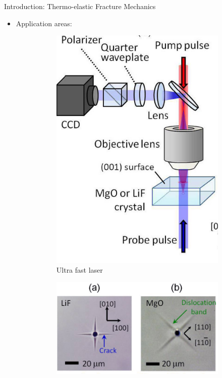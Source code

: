\documentclass{beamer}
\begin{document}
\begin{frame}[t,fragile]{Introduction: Thermo-elastic Fracture Mechanics}
\begin{itemize}
        \item Application areas:
       \vspace{-.1cm}
\begin{figure}[H]
      \begin{subfigure}{0.45\textwidth}
    \centering
   \includegraphics[scale=.1]{m}
 \vspace{-.2cm}
 \caption{\tiny Ultra fast laser}
 \end{subfigure}
\begin{subfigure}{0.45\textwidth}
    \centering
   \includegraphics[scale=.1]{l}

\end{subfigure}
\end{figure}
\end{itemize}
\end{frame}
\end{document}
